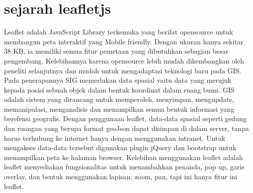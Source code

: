  
 
 
 \section{sejarah leafletjs}
        Leaflet adalah JavaScript Library terkemuka yang berifat opensource untuk membangun peta interaktif yang Mobile friendly. Dengan ukuran hanya sekitar 38 KB, ia memiliki semua fitur pemetaan yang dibutuhkan sebagian besar pengembang.
    Kelebihannya karena opensource lebih mudah dikembangkan oleh peneliti selanjutnya dan mudah untuk mengadaptasi teknologi baru pada GIS. Pada penerapannya SIG memerlukan data spasial yaitu data yang merujuk kepada posisi sebuah objek dalam bentuk koordinat dalam ruang bumi. GIS adalah sistem yang dirancang untuk memperoleh, menyimpan, mengupdate, memanipulasi, menganalisis dan menampilkan semua bentuk informasi yang berefensi geografis.
Dengan penggunaan leaflet, data-data spasial seperti gedung dan ruangan yang berupa format geoJson dapat disimpan di dalam server, tanpa harus terhubung ke internet hanya dengan menggunakan intranet. Untuk mengakses data-data tersebut digunakan plugin jQuery dan bootstrap untuk menampilkan peta ke halaman browser. Kelebihan menggunakan leaflet adalah leaflet menyediakan fungsionalitas untuk menambahkan penanda, pop up, garis overlay, dan bentuk menggunakan lapisan, zoom, pan, tapi ini hanya fitur ini leaflet.

